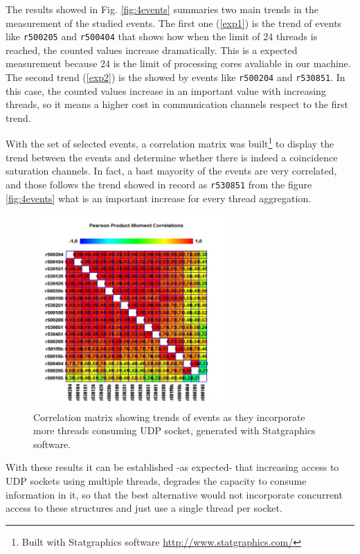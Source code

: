 \documentclass[journal]{IEEEtran}
\begin{document}
The results showed in Fig. \ref{fig:4events} summaries two main trends in the measurement of the studied events. The first one (\ref{exp1}) is the trend of events like \verb=r500205= and \verb=r500404= that shows how when the limit of 24 threads is reached, the counted values increase dramatically. This is a expected measurement because 24 is the limit of processing cores avaliable in our machine. The second trend (\ref{exp2}) is the showed by events like \verb=r500204= and \verb=r530851=. In this case, the counted values increase in an important value with increasing threads, so it means a higher cost in communication channels respect to the first trend.

With the set of selected events, a correlation matrix was built\footnote{Built with Statgraphics software \url{http://www.statgraphics.com/}} to display the trend between the events and determine whether there is indeed a coincidence saturation channels. In fact, a bast mayority of the events are very correlated, and those  follows the trend showed in record as \verb=r530851= from the figure \ref{fig:4events} what is an important increase for every thread aggregation.

\begin{figure}[!h]
\centering
	\includegraphics[width=2.9in]{Imagenes/correlationMatrix}
	\caption{Correlation matrix showing trends of events as they incorporate more threads consuming UDP socket, generated with Statgraphics software.}
	\label{fig:corrMatrix}
\end{figure}

With these results it can be established -as expected- that increasing access to UDP sockets using multiple threads, degrades the capacity to consume information in it, so that the best alternative would not incorporate concurrent access to these structures and just use a single thread per socket.
\end{document}
